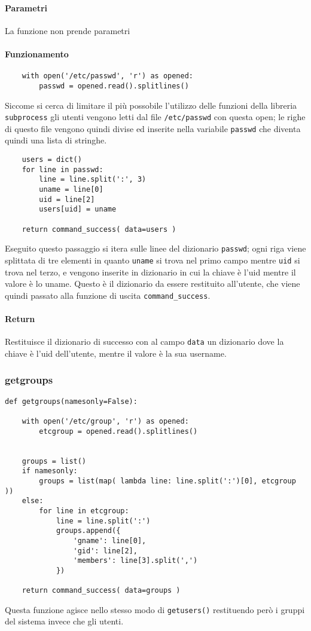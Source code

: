\documentclass[11pt]{article}
\begin{document}
\paragraph{Parametri}
La funzione non prende parametri
\paragraph{Funzionamento}
\begin{lstlisting}
    with open('/etc/passwd', 'r') as opened:
        passwd = opened.read().splitlines()
\end{lstlisting}
Siccome si cerca di limitare il più possobile l'utilizzo delle funzioni della libreria \texttt{subprocess} gli utenti vengono letti
dal file \texttt{/etc/passwd} con questa open; le righe di questo file vengono quindi divise ed inserite
nella variabile \texttt{passwd} che diventa quindi una lista di stringhe.
\begin{lstlisting}
    users = dict()
    for line in passwd:
        line = line.split(':', 3)
        uname = line[0]
        uid = line[2]
        users[uid] = uname

    return command_success( data=users )
\end{lstlisting}
Eseguito questo passaggio si itera sulle linee del dizionario \texttt{passwd}; ogni riga viene splittata di tre elementi in quanto
\texttt{uname} si trova nel primo campo mentre \texttt{uid} si trova nel terzo, e vengono inserite in dizionario in cui la chiave
è l'uid mentre il valore è lo uname. Questo è il dizionario da essere restituito all'utente, che viene quindi passato alla funzione
di uscita \texttt{command\_success}.
\paragraph{Return}
Restituisce il dizionario di successo con al campo \texttt{data} un dizionario dove la chiave è l'uid dell'utente, mentre il valore è
la sua username.

\subsubsection{getgroups}\label{getgroups}
\begin{lstlisting}
def getgroups(namesonly=False):

    with open('/etc/group', 'r') as opened:
        etcgroup = opened.read().splitlines()


    groups = list()
    if namesonly:
        groups = list(map( lambda line: line.split(':')[0], etcgroup ))
    else:
        for line in etcgroup:
            line = line.split(':')
            groups.append({
                'gname': line[0],
                'gid': line[2],
                'members': line[3].split(',')
            })
    
    return command_success( data=groups )
\end{lstlisting}
Questa funzione agisce nello stesso modo di \texttt{getusers()} restituendo però i gruppi del sistema invece che gli utenti.
\end{document}

